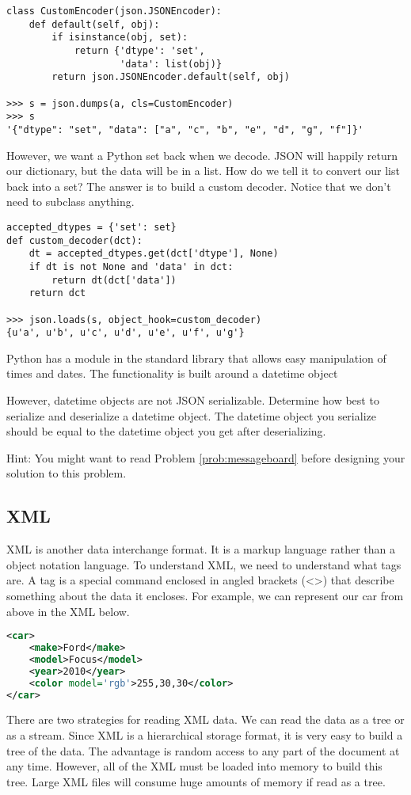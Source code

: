 \begin{lstlisting}
class CustomEncoder(json.JSONEncoder):
    def default(self, obj):
        if isinstance(obj, set):
            return {'dtype': 'set',
                    'data': list(obj)}
        return json.JSONEncoder.default(self, obj)
        
>>> s = json.dumps(a, cls=CustomEncoder)
>>> s
'{"dtype": "set", "data": ["a", "c", "b", "e", "d", "g", "f"]}'
\end{lstlisting}
However, we want a Python set back when we decode.
JSON will happily return our dictionary, but the data will be in a list.
How do we tell it to convert our list back into a set?
The answer is to build a custom decoder.
Notice that we don't need to subclass anything.
\begin{lstlisting}
accepted_dtypes = {'set': set}
def custom_decoder(dct):
    dt = accepted_dtypes.get(dct['dtype'], None)
    if dt is not None and 'data' in dct:
        return dt(dct['data'])
    return dct

>>> json.loads(s, object_hook=custom_decoder)
{u'a', u'b', u'c', u'd', u'e', u'f', u'g'}
\end{lstlisting}

\begin{problem}
Python has a module in the standard library that allows easy manipulation of times and dates.  The functionality is built around a datetime object

However, datetime objects are not JSON serializable.
Determine how best to serialize and deserialize a datetime object.
The datetime object you serialize should be equal to the datetime object you get after deserializing.

Hint: You might want to read Problem \ref{prob:messageboard} before designing your solution to this problem.
\label{prob:datetime_json}
\end{problem}

\subsection*{XML}
XML is another data interchange format.  It is a markup language rather than a object notation language.
To understand XML, we need to understand what tags are.
A tag is a special command enclosed in angled brackets (<>) that describe something about the data it encloses.
For example, we can represent our car from above in the XML below.
\begin{lstlisting}[language=XML]
<car>
    <make>Ford</make>
    <model>Focus</model>
    <year>2010</year>
    <color model='rgb'>255,30,30</color>
</car>
\end{lstlisting}
There are two strategies for reading XML data.
We can read the data as a tree or as a stream.
Since XML is a hierarchical storage format, it is very easy to build a tree of the data.
The advantage is random access to any part of the document at any time.
However, all of the XML must be loaded into memory to build this tree.
Large XML files will consume huge amounts of memory if read as a tree.

